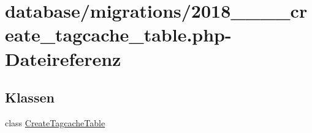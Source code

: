 \hypertarget{2018__06__15__121944__create__tagcache__table_8php}{}\section{database/migrations/2018\+\_\+\_\+\_\+\_\+create\+\_\+tagcache\+\_\+table.php-\/\+Dateireferenz}
\label{2018__06__15__121944__create__tagcache__table_8php}
\subsection*{Klassen}
\begin{DoxyCompactItemize}
\item 
class \hyperlink{classCreateTagcacheTable}{Create\+Tagcache\+Table}
\end{DoxyCompactItemize}
